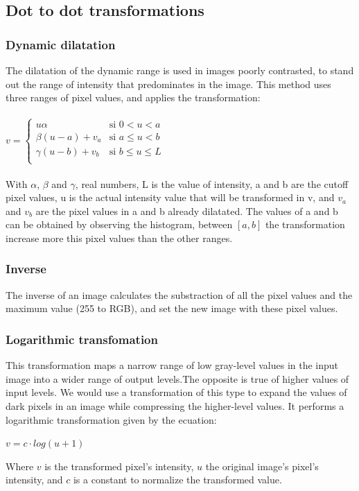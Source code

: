 \documentclass[a4paper]{article}
\begin{document}
\subsection{Dot to dot transformations}


\subsubsection{Dynamic dilatation}

The dilatation of the dynamic range is used in images poorly contrasted, to stand out the range of intensity that predominates in the image. This method uses three ranges of pixel values, and applies the transformation:\\ 
\\
\begin{math}
v= \left\{
	\begin{array}{cl}
		u\alpha & \mbox{si } 0<u<a\\
		\beta(u-a)+v_a &\mbox{si } a\leq u<b\\
	\gamma(u-b)+v_b &\mbox{si } b\leq u\leq L\\
	\end{array}\right.
\end{math}
\\
\\
With $\alpha$, $\beta$ and $\gamma$, real numbers, L is the 
value of intensity, a and b are the cutoff pixel values, u is the actual intensity value that will be transformed in v, and $v_a$ and $v_b$ are the pixel values in a and b already dilatated.
The values of a and b can be obtained by observing the histogram, between $\left[a,b\right]$ the transformation increase more this pixel values than the other ranges.
\subsubsection{Inverse}

The inverse of an image calculates the substraction of all the pixel values and the maximum value (255 to RGB), and set the new image with these pixel values.

\subsubsection{Logarithmic transfomation}
This transformation maps a narrow range of low gray-level values in the input image into a wider range of output levels.The opposite is true of higher values of input levels. We would use a transformation of this type to expand the values of dark pixels in an image while compressing the higher-level values.
It performs a logarithmic transformation given by the ecuation:
\begin{center}
	$v = c \cdot log (u + 1)$
\end{center}
Where $v$ is the transformed pixel's intensity, $u$ the original image's pixel's intensity, and $c$ is a constant to normalize the transformed value.
\end{document}
